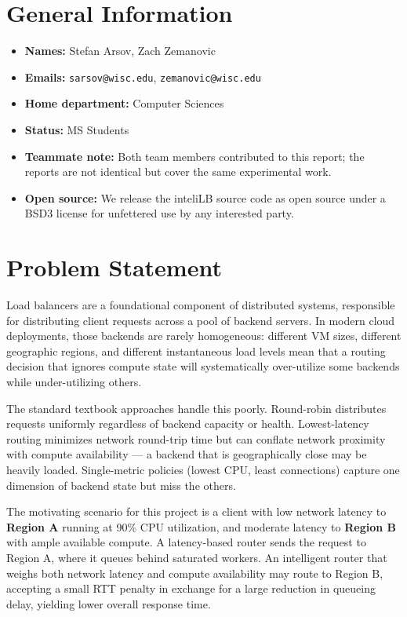 \documentclass[12pt]{article}
\begin{document}
\section*{General Information}
\begin{itemize}[leftmargin=2em]
  \item \textbf{Names:} Stefan Arsov, Zach Zemanovic
  \item \textbf{Emails:} \texttt{sarsov@wisc.edu}, \texttt{zemanovic@wisc.edu}
  \item \textbf{Home department:} Computer Sciences
  \item \textbf{Status:} MS Students
  \item \textbf{Teammate note:} Both team members contributed to this report;
        the reports are not identical but cover the same experimental work.
  \item \textbf{Open source:} We release the inteliLB source code as open
        source under a BSD3 license for unfettered use by any interested party.
\end{itemize}

\section{Problem Statement}

Load balancers are a foundational component of distributed systems, responsible
for distributing client requests across a pool of backend servers. In modern
cloud deployments, those backends are rarely homogeneous: different VM sizes,
different geographic regions, and different instantaneous load levels mean that
a routing decision that ignores compute state will systematically over-utilize
some backends while under-utilizing others.

The standard textbook approaches handle this poorly. Round-robin distributes
requests uniformly regardless of backend capacity or health. Lowest-latency
routing minimizes network round-trip time but can conflate network proximity with
compute availability --- a backend that is geographically close may be heavily
loaded. Single-metric policies (lowest CPU, least connections) capture one
dimension of backend state but miss the others.

The motivating scenario for this project is a client with low network latency
to \textbf{Region A} running at 90\% CPU utilization, and moderate latency to
\textbf{Region B} with ample available compute. A latency-based router sends
the request to Region A, where it queues behind saturated workers. An
intelligent router that weighs both network latency and compute availability
may route to Region B, accepting a small RTT penalty in exchange for a large
reduction in queueing delay, yielding lower overall response time.
\end{document}
